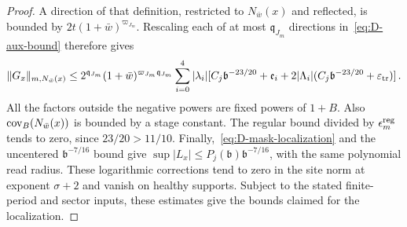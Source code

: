 \begin{proof}
A direction of that definition, restricted to $N_{\bar w}(x)$ and reflected, is bounded by $2t(1+\bar w)^{\varpi_{J_m}}$. Rescaling each of at most $\mathfrak q_{J_m}$ directions in~\eqref{eq:D-aux-bound} therefore gives
\begin{equation*}
\|G_x\|_{m,N_{\bar w}(x)}\le
2^{\mathfrak q_{J_m}}(1+\bar w)^{\varpi_{J_m}\mathfrak q_{J_m}}
\sum_{i=0}^4|\lambda_i|
 [C_j \mathfrak b^{-23/20}+\mathfrak e_i+2|\Lambda_i|(C_j \mathfrak b^{-23/20}+\varepsilon_{\rm tr})]\,.
\end{equation*}
All the factors outside the negative powers are fixed powers of $1+B$. Also $\operatorname{cov}_B(N_{\bar w}(x))$ is bounded by a stage constant. The regular bound divided by $\epsilon_m^{\rm reg}$ tends to zero, since $23/20>11/10$. Finally,~\eqref{eq:D-mask-localization} and the uncentered $\mathfrak b^{-7/16}$ bound give $\sup|L_x|\le P_j(\mathfrak b)\mathfrak b^{-7/16}$, with the same polynomial read radius. These logarithmic corrections tend to zero in the site norm at exponent $\sigma+2$ and vanish on healthy supports. Subject to the stated finite-period and sector inputs, these estimates give the bounds claimed for the localization.
\end{proof}

